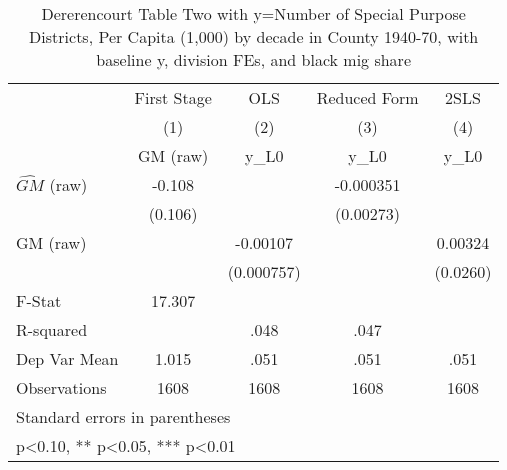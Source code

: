 \begin{table}[htbp]\centering
\def\sym#1{\ifmmode^{#1}\else\(^{#1}\)\fi}
\caption{Dererencourt Table Two with y=Number of Special Purpose Districts, Per Capita (1,000) by decade in County 1940-70, with baseline y, division FEs, and black mig share}
\begin{tabular}{l*{4}{c}}
\toprule
                    & First Stage   &         OLS   &Reduced Form   &        2SLS   \\
                    &\multicolumn{1}{c}{(1)}&\multicolumn{1}{c}{(2)}&\multicolumn{1}{c}{(3)}&\multicolumn{1}{c}{(4)}\\
                    &\multicolumn{1}{c}{GM  (raw)}&\multicolumn{1}{c}{y\_L0}&\multicolumn{1}{c}{y\_L0}&\multicolumn{1}{c}{y\_L0}\\
\midrule
$\hat{GM}$ (raw)    &      -0.108   &               &   -0.000351   &               \\
                    &     (0.106)   &               &   (0.00273)   &               \\
\addlinespace
GM  (raw)           &               &    -0.00107   &               &     0.00324   \\
                    &               &  (0.000757)   &               &    (0.0260)   \\
\midrule
F-Stat              &      17.307   &               &               &               \\
R-squared           &               &        .048   &        .047   &               \\
Dep Var Mean        &       1.015   &        .051   &        .051   &        .051   \\
Observations        &        1608   &        1608   &        1608   &        1608   \\
\bottomrule
\multicolumn{5}{l}{\footnotesize Standard errors in parentheses}\\
\multicolumn{5}{l}{\footnotesize * p<0.10, ** p<0.05, *** p<0.01}\\
\end{tabular}
\end{table}
